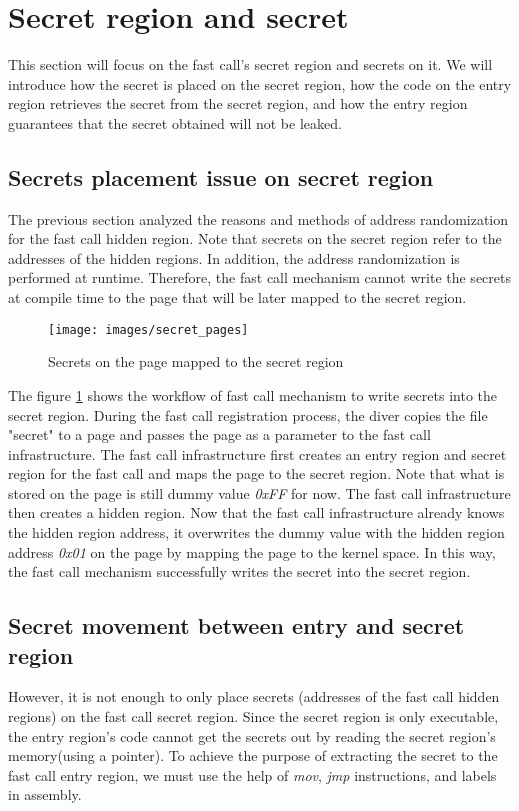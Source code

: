 \section{Secret region and secret}

This section will focus on the fast call's secret region and 
secrets on it. We will introduce how the secret is placed on the secret region, how the code on 
the entry region retrieves the secret from the secret region, 
and how the entry region guarantees that the secret obtained will not be leaked.

\subsection{Secrets placement issue on secret region}
The previous section analyzed the reasons and methods of address randomization 
for the fast call hidden region. Note that secrets on the secret region refer 
to the addresses of the hidden regions. In addition, the address randomization 
is performed at runtime. Therefore, the fast call mechanism cannot write the 
secrets at compile time to the page that will be later mapped to the secret region.

\begin{figure}[tbp]
  \centering
  \texttt{[image: images/secret\_pages]}
  \caption[Short description]{Secrets on the page mapped to the secret region}
  \label{fig:secret_pages}
\end{figure}

The figure \ref{fig:secret_pages} shows the workflow of fast call mechanism to write secrets into the secret region. 
During the fast call registration process,
the diver copies the file "secret" to a page and passes the page as a parameter to
 the fast call infrastructure. The fast call infrastructure first creates an entry 
 region and secret region for the fast call and maps the page to the secret region. 
 Note that what is stored on the page is still dummy value \emph{0xFF} for now. The fast call 
 infrastructure then creates a hidden region. Now that the fast call infrastructure 
 already knows the hidden region address, it overwrites the dummy value with the hidden 
 region address \emph{0x01} on the page by mapping the page to the kernel space. In this way, the fast call mechanism 
 successfully writes the secret into the secret region.


 \subsection{Secret movement between entry and secret region}
 However, it is not enough to only place secrets
 (addresses of the fast call hidden regions) on the fast call secret region. 
 Since the secret region is only executable, the entry region's code cannot 
 get the secrets out by reading the secret region's memory(using a pointer).
To achieve the purpose of extracting the secret to the fast call entry region, 
  we must use the help of \emph{mov}, \emph{jmp} instructions, and labels in assembly.

